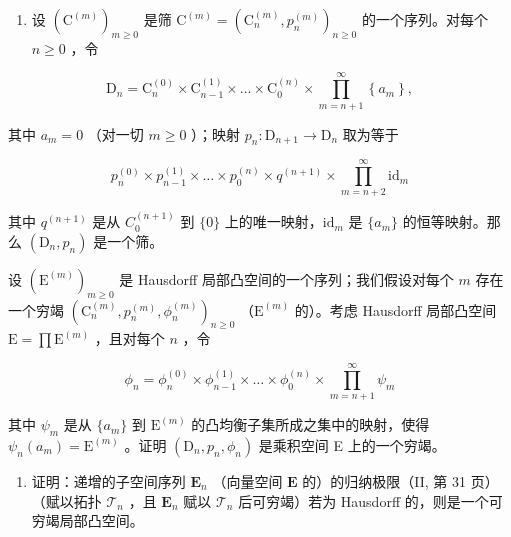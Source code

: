 \begin{enumerate}
\def\labelenumi{\arabic{enumi})}
\setcounter{enumi}{4}
\tightlist
\item
  设 \((\mathrm{C}^{(m)})_{m\geqslant 0}\) 是筛 \(\mathrm{C}^{(m)} = (\mathrm{C}_n^{(m)},p_n^{(m)})_{n\geqslant 0}\) 的一个序列。对每个 \(n\geqslant 0\) ，令
\end{enumerate}

\[
\mathrm{D} _ {n} = \mathrm{C} _ {n} ^ {(0)} \times \mathrm{C} _ {n - 1} ^ {(1)} \times \dots \times \mathrm{C} _ {0} ^ {(n)} \times \prod_ {m = n + 1} ^ {\infty} \left\{a _ {m} \right\},
\]

其中 \(a_{m} = 0\) （对一切 \(m\geqslant 0\) ）；映射 \(p_n:\mathrm{D}_{n + 1}\to \mathrm{D}_n\) 取为等于

\[
p _ {n} ^ {(0)} \times p _ {n - 1} ^ {(1)} \times \dots \times p _ {0} ^ {(n)} \times q ^ {(n + 1)} \times \prod_ {m = n + 2} ^ {\infty} \mathrm{id} _ {m}
\]

其中 \(q^{(n + 1)}\) 是从 \(C_0^{(n + 1)}\) 到 \(\{0\}\) 上的唯一映射，\(\mathrm{id}_m\) 是 \(\{a_m\}\) 的恒等映射。那么 \((\mathrm{D}_n, p_n)\) 是一个筛。

设 \((\mathrm{E}^{(m)})_{m\geqslant 0}\) 是 Hausdorff 局部凸空间的一个序列；我们假设对每个 \(m\) 存在一个穷竭 \((\mathrm{C}_n^{(m)},p_n^{(m)},\phi_n^{(m)})_{n\geqslant 0}\) （\(\mathrm{E}^{(m)}\) 的）。考虑 Hausdorff 局部凸空间 \(\mathrm{E} = \prod \mathrm{E}^{(m)}\) ，且对每个 \(n\) ，令

\[
\phi_ {n} = \phi_ {n} ^ {(0)} \times \phi_ {n - 1} ^ {(1)} \times \dots \times \phi_ {0} ^ {(n)} \times \prod_ {m = n + 1} ^ {\infty} \psi_ {m}
\]

其中 \(\psi_{m}\) 是从 \(\{a_m\}\) 到 \(\mathrm{E}^{(m)}\) 的凸均衡子集所成之集中的映射，使得 \(\psi_{n}(a_{m}) = \mathrm{E}^{(m)}\) 。证明 \((\mathrm{D}_n,p_n,\phi_n)\) 是乘积空间 E 上的一个穷竭。

\begin{enumerate}
\def\labelenumi{\arabic{enumi})}
\setcounter{enumi}{5}
\tightlist
\item
  证明：递增的子空间序列 \(\mathbf{E}_n\) （向量空间 \(\mathbf{E}\) 的）的归纳极限（II, 第 31 页）（赋以拓扑 \(\mathcal{T}_n\) ，且 \(\mathbf{E}_n\) 赋以 \(\mathcal{T}_n\) 后可穷竭）若为 Hausdorff 的，则是一个可穷竭局部凸空间。
\end{enumerate}

